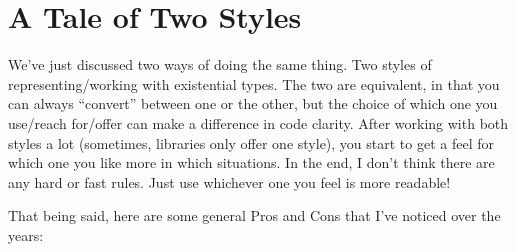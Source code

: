 \documentclass[]{article}
\begin{document}
\section{A Tale of Two Styles}\label{a-tale-of-two-styles}

We've just discussed two ways of doing the same thing. Two styles of
representing/working with existential types. The two are equivalent, in that you
can always ``convert'' between one or the other, but the choice of which one you
use/reach for/offer can make a difference in code clarity. After working with
both styles a lot (sometimes, libraries only offer one style), you start to get
a feel for which one you like more in which situations. In the end, I don't
think there are any hard or fast rules. Just use whichever one you feel is more
readable!

That being said, here are some general Pros and Cons that I've noticed over the
years:
\end{document}
